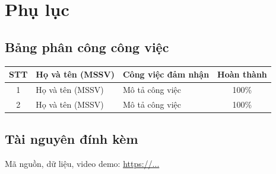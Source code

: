 \section*{Phụ lục}

\subsection*{Bảng phân công công việc}
\begin{table}[ht]
    \centering
    \begin{tabularx}{\textwidth}{|c|p{4.2cm}|X|c|}
        \hline
        \textbf{STT} & \textbf{Họ và tên (MSSV)} & \textbf{Công việc đảm nhận} & \textbf{Hoàn thành} \\
        \hline
        1 & Họ và tên (MSSV) & Mô tả công việc & 100\% \\
        \hline
        2 & Họ và tên (MSSV) & Mô tả công việc & 100\% \\
        \hline
    \end{tabularx}
\end{table}

\subsection*{Tài nguyên đính kèm}
Mã nguồn, dữ liệu, video demo: \url{https://...}
